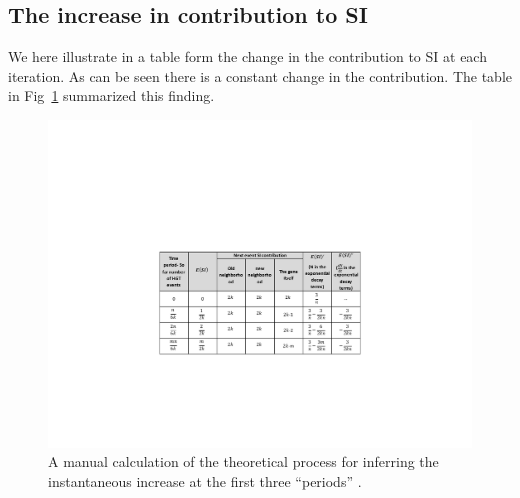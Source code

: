 \documentclass[runningheads, 11pt]{llncs}
\begin{document}
\subsection{The increase in contribution to SI}\label{sec-append-table}
We here illustrate in a table form the change in the contribution to SI at each
iteration. As can be seen there is a constant change in the contribution. The
table in Fig~\ref{fig-SI-contr-tab} summarized this finding.

\begin{figure}[h]
\begin{center}

\includegraphics[width = 6in,angle=0]{figs/exp-decay-table.pdf} 
\caption{\small A manual calculation of the theoretical process for inferring
the instantaneous increase at the first three ``periods'' .
\label{fig-SI-contr-tab}}
 \end{center}
\end{figure}
\end{document}
